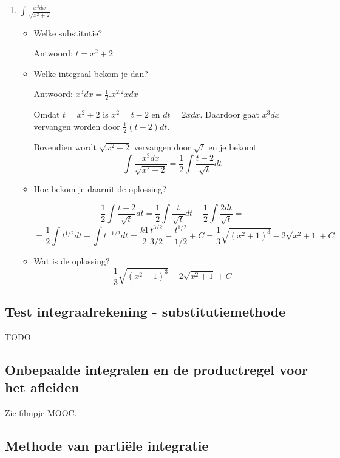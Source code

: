 \begin{enumerate}
\begin{itemize}
	\end{itemize}
	
	\item $\int \frac{x^3dx}{\sqrt{x^2+2}}$
	
	\begin{itemize}
		\item Welke substitutie?
		
		Antwoord: $t=x^2+2$
		
		\item Welke integraal bekom je dan?
		
		Antwoord: $x^3dx=\frac{1}{2}.x^2.2xdx$
		
		Omdat $t=x^2+2$ is $x^2=t-2$ en $dt=2xdx$.
		Daardoor gaat $x^3dx$ vervangen worden door $\frac{1}{2}(t-2)dt$.
		
		Bovendien wordt $\sqrt{x^2+2}$ vervangen door $\sqrt{t}$ en je bekomt
		\[
		\int \frac{x^3dx}{\sqrt{x^2+2}}=\frac{1}{2} \int \frac{t-2}{\sqrt{t}}dt
		\]
		
		\item Hoe bekom je daaruit de oplossing?
		
		\[
		\frac{1}{2} \int \frac{t-2}{\sqrt{t}}dt=\frac{1}{2} \int \frac{t}{\sqrt{t}}dt - \frac{1}{2}\int \frac{2dt}{\sqrt{t}}=
		\]
		\[
		=\frac{1}{2} \int t^{1/2}dt - \int t^{-1/2}dt=\frac{k1}{2}\frac{t^{3/2}}{3/2}-\frac{t^{1/2}}{1/2}+C=\frac{1}{3} \sqrt{(x^2+1)^3}-2\sqrt{x^2+1}+C
		\]
		
		\item Wat is de oplossing?
		\[
		\frac{1}{3} \sqrt{(x^2+1)^3}-2\sqrt{x^2+1}+C
		\]
		
	\end{itemize}
	
\end{enumerate}


\subsection{Test integraalrekening - substitutiemethode}
TODO

\subsection{Onbepaalde integralen en de productregel voor het afleiden}
Zie filmpje MOOC.

\subsection{Methode van parti\"ele integratie}

